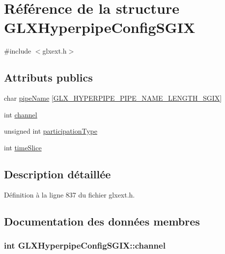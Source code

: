 \hypertarget{struct_g_l_x_hyperpipe_config_s_g_i_x}{\section{Référence de la structure G\-L\-X\-Hyperpipe\-Config\-S\-G\-I\-X}
\label{struct_g_l_x_hyperpipe_config_s_g_i_x}
}


{\ttfamily \#include $<$glxext.\-h$>$}

\subsection*{Attributs publics}
\begin{DoxyCompactItemize}
\item 
char \hyperlink{struct_g_l_x_hyperpipe_config_s_g_i_x_a9e3748f92005cac81cb44d4c67acccb8}{pipe\-Name} \mbox{[}\hyperlink{glxext_8h_ae1c8261c0861010d8003a31d07e26005}{G\-L\-X\-\_\-\-H\-Y\-P\-E\-R\-P\-I\-P\-E\-\_\-\-P\-I\-P\-E\-\_\-\-N\-A\-M\-E\-\_\-\-L\-E\-N\-G\-T\-H\-\_\-\-S\-G\-I\-X}\mbox{]}
\item 
int \hyperlink{struct_g_l_x_hyperpipe_config_s_g_i_x_abc812d8796ba89d5de4e33b3532d8335}{channel}
\item 
unsigned int \hyperlink{struct_g_l_x_hyperpipe_config_s_g_i_x_a093cfaaec305531f66e1120929b5b01b}{participation\-Type}
\item 
int \hyperlink{struct_g_l_x_hyperpipe_config_s_g_i_x_afe9288e75dc1ae5e0f33eff978d7024d}{time\-Slice}
\end{DoxyCompactItemize}


\subsection{Description détaillée}


Définition à la ligne 837 du fichier glxext.\-h.



\subsection{Documentation des données membres}
\hypertarget{struct_g_l_x_hyperpipe_config_s_g_i_x_abc812d8796ba89d5de4e33b3532d8335}{
\subsubsection[{channel}]{\setlength{\rightskip}{0pt plus 5cm}int G\-L\-X\-Hyperpipe\-Config\-S\-G\-I\-X\-::channel}}\label{struct_g_l_x_hyperpipe_config_s_g_i_x_abc812d8796ba89d5de4e33b3532d8335}


